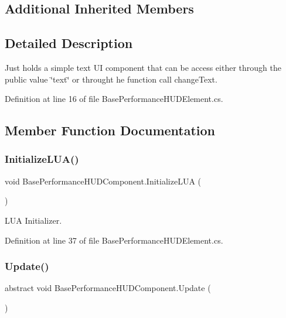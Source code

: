 \subsection*{Additional Inherited Members}


\subsection{Detailed Description}
Just holds a simple text UI component that can be access either through the public value \char`\"{}text\char`\"{} or throught he function call change\+Text. 



Definition at line 16 of file Base\+Performance\+H\+U\+D\+Element.\+cs.



\subsection{Member Function Documentation}
\mbox{\label{class_base_performance_h_u_d_component_a96a35c9abee1fe9f275b906bfdbdeec2}} 
\subsubsection{\texorpdfstring{Initialize\+L\+U\+A()}{InitializeLUA()}}
{\footnotesize\ttfamily void Base\+Performance\+H\+U\+D\+Component.\+Initialize\+L\+UA (\begin{DoxyParamCaption}{ }\end{DoxyParamCaption})}



L\+UA Initializer. 



Definition at line 37 of file Base\+Performance\+H\+U\+D\+Element.\+cs.

\mbox{\label{class_base_performance_h_u_d_component_a7a585b4c22bd5b3daee51bf126fa1cec}} 
\subsubsection{\texorpdfstring{Update()}{Update()}}
{\footnotesize\ttfamily abstract void Base\+Performance\+H\+U\+D\+Component.\+Update (\begin{DoxyParamCaption}{ }\end{DoxyParamCaption})\hspace{0.3cm}{\ttfamily [pure virtual]}}

